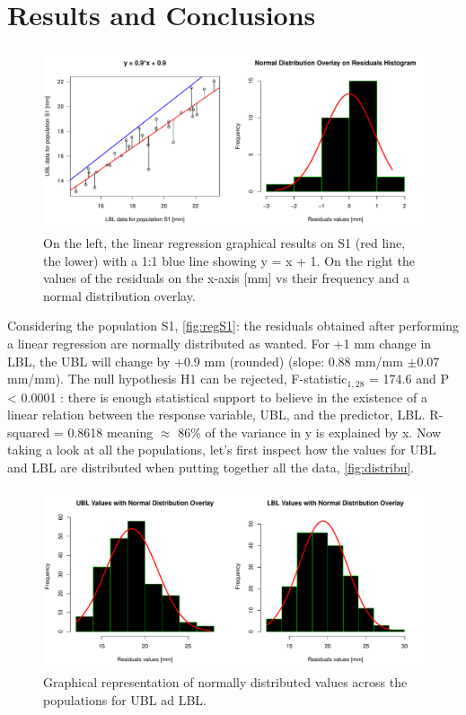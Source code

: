 \documentclass{article}
\begin{document}
\section{Results and Conclusions}
\begin{figure}[H]
\centering
  \includegraphics[scale=0.4]{reg_S1.pdf}
\caption{On the left, the linear regression graphical results on S1 (red line, the lower) with a 1:1 blue line showing y = x + 1. On the right the values of the residuals on the x-axis [mm] vs their frequency and a normal distribution overlay.}
  \label{fig:regS1}
\end{figure}
Considering the population S1, \autoref{fig:regS1}: the residuals obtained after performing a linear regression are normally distributed as wanted. For +1 mm change in LBL, the UBL will change by +0.9 mm (rounded) (slope: 0.88 mm/mm $\pm$0.07 mm/mm). The null hypothesis H1 can be rejected, F-statistic$_{1, 28}$ = 174.6 and  P < 0.0001 : there is enough statistical support to believe in the existence of a linear relation between the response variable, UBL, and the predictor, LBL. R-squared = 0.8618 meaning $\approx$ 86\% of the variance in y is explained by x.
Now taking a look at all the populations, let's first inspect how the values for UBL and LBL are distributed when putting together all the data, \autoref{fig:distribu}.
\begin{figure}[H]
\centering
  \includegraphics[scale=0.45]{ubl_lbl-distr.pdf}
\caption{Graphical representation of normally distributed values across the populations for UBL ad LBL.}
  \label{fig:distribu}
\end{figure}
\end{document}
